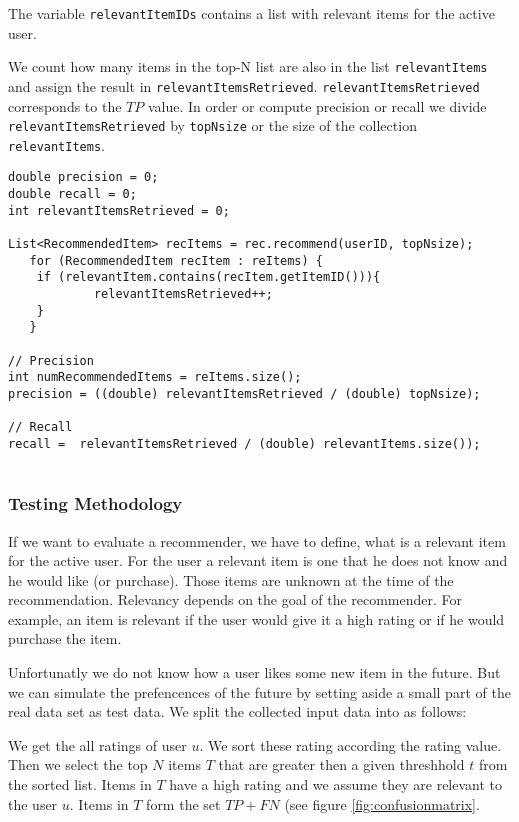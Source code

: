 The variable \verb|relevantItemIDs| contains a list with relevant items for the active user.

We count how many items in the top-N list are also in the list \verb|relevantItems| and assign the result in \verb|relevantItemsRetrieved|. \verb|relevantItemsRetrieved| corresponds to the $TP$ value. In order or compute precision or recall we divide \verb|relevantItemsRetrieved| by \verb|topNsize| or the size of the collection\\ \verb|relevantItems|.

\begin{lstlisting}[caption=Implementation of precision and recall,label=lst:irstats]
double precision = 0;
double recall = 0;
int relevantItemsRetrieved = 0;

List<RecommendedItem> recItems = rec.recommend(userID, topNsize);
   for (RecommendedItem recItem : reItems) {
	if (relevantItem.contains(recItem.getItemID())){
			relevantItemsRetrieved++;
	}
   }

// Precision
int numRecommendedItems = reItems.size();
precision = ((double) relevantItemsRetrieved / (double) topNsize);
		      
// Recall
recall =  relevantItemsRetrieved / (double) relevantItems.size());
		      
\end{lstlisting}

\subsubsection{Testing Methodology}
\label{sec:methodology}

If we want to evaluate a recommender, we have to define, what is a relevant item for the active user. For the user a relevant item is one that he does not know and he would like (or purchase). Those items are unknown at the time of the recommendation. Relevancy depends on the goal of the recommender. For example, an item is relevant if the user would give it a high rating or if he would purchase the item.

Unfortunatly we do not know how a user likes some new item in the future.
But we can simulate the prefencences of the future by setting aside a small part of the real data set as test data. We split the collected input data into as follows:


We get the all ratings of user $u$. We sort these rating according the rating value. Then we select the top $N$ items $T$ that are greater then a given threshhold $t$ from the sorted list. Items in $T$ have a high rating and we assume they are relevant to the user $u$. Items in $T$ form the set $TP + FN$ (see figure \ref{fig:confusionmatrix}.

